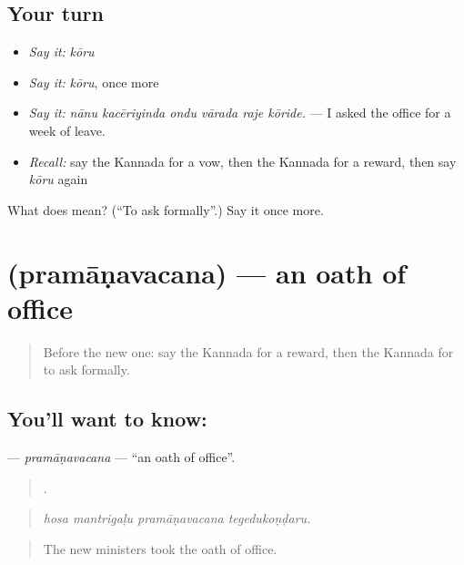 \subsection*{Your turn}
\begin{itemize}
\raggedright
  \item \emph{Say it:} \emph{kōru}
  \item \emph{Say it:} \emph{kōru}, once more
  \item \emph{Say it:} \emph{nānu kacēriyinda ondu vārada raje kōride.} — I asked the office for a week of leave.
  \item \emph{Recall:} say the Kannada for a vow, then the Kannada for a reward, then say \emph{kōru} again
\end{itemize}

\begin{tcolorbox}[breakable,colback=teal!4,colframe=teal!35!black,title={Before you move on}]
What does  mean? (\textquotedblleft{}To ask formally\textquotedblright{}.) Say it once more.
\end{tcolorbox}
\section[\texorpdfstring{\kn{ಪ್ರಮಾಣವಚನ} (pramāṇavacana)}{ಪ್ರಮಾಣವಚನ (pramāṇavacana)}]{ (pramāṇavacana) — an oath of office}

\label{lesson:KA-C416-pramanavacana}



\begin{quote}
Before the new one: say the Kannada for a reward, then the Kannada for to ask formally.
\end{quote}

\subsection*{You'll want to know: }
\textbf{} — \emph{pramāṇavacana} — \textquotedblleft{}an oath of office\textquotedblright{}.

\begin{quote}
   .
\end{quote}

\begin{quote}
\emph{hosa mantrigaḷu pramāṇavacana tegedukoṇḍaru.}
\end{quote}

\begin{quote}
The new ministers took the oath of office.
\end{quote}

